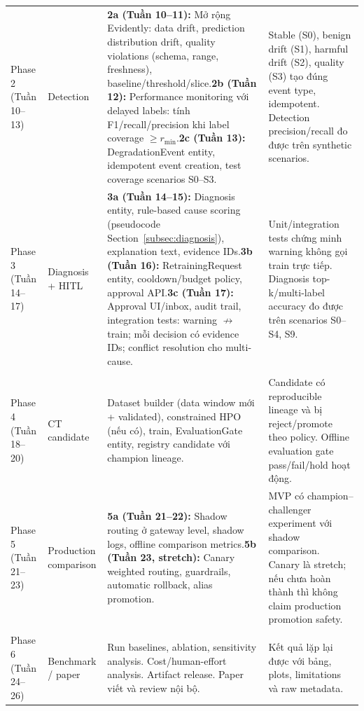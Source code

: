 \documentclass[11pt,a4paper]{article}
\begin{document}
\begin{longtable}{@{}P{1.4cm}P{2.8cm}P{4.0cm}P{5.2cm}@{}}
Phase 2 (Tuần 10--13) & Detection & \textbf{2a (Tuần 10--11):} Mở rộng Evidently: data drift, prediction distribution drift, quality violations (schema, range, freshness), baseline/threshold/slice.\newline \textbf{2b (Tuần 12):} Performance monitoring với delayed labels: tính F1/recall/precision khi label coverage $\ge r_\text{min}$.\newline \textbf{2c (Tuần 13):} DegradationEvent entity, idempotent event creation, test coverage scenarios S0--S3. & Stable (S0), benign drift (S1), harmful drift (S2), quality (S3) tạo đúng event type, idempotent. Detection precision/recall đo được trên synthetic scenarios. \\
\addlinespace

Phase 3 (Tuần 14--17) & Diagnosis + HITL & \textbf{3a (Tuần 14--15):} Diagnosis entity, rule-based cause scoring (pseudocode Section~\ref{subsec:diagnosis}), explanation text, evidence IDs.\newline \textbf{3b (Tuần 16):} RetrainingRequest entity, cooldown/budget policy, approval API.\newline \textbf{3c (Tuần 17):} Approval UI/inbox, audit trail, integration tests: warning $\not\rightarrow$ train; mỗi decision có evidence IDs; conflict resolution cho multi-cause. & Unit/integration tests chứng minh warning không gọi train trực tiếp. Diagnosis top-k/multi-label accuracy đo được trên scenarios S0--S4, S9. \\

\addlinespace
{}\\
\addlinespace

Phase 4 (Tuần 18--20) & CT candidate & Dataset builder (data window mới + validated), constrained HPO (nếu có), train, EvaluationGate entity, registry candidate với champion lineage. & Candidate có reproducible lineage và bị reject/promote theo policy. Offline evaluation gate pass/fail/hold hoạt động. \\
\addlinespace

Phase 5 (Tuần 21--23) & Production comparison & \textbf{5a (Tuần 21--22):} Shadow routing ở gateway level, shadow logs, offline comparison metrics.\newline \textbf{5b (Tuần 23, stretch):} Canary weighted routing, guardrails, automatic rollback, alias promotion. & MVP có champion--challenger experiment với shadow comparison. Canary là stretch; nếu chưa hoàn thành thì không claim production promotion safety. \\

\addlinespace
{}\\
\addlinespace

Phase 6 (Tuần 24--26) & Benchmark / paper & Run baselines, ablation, sensitivity analysis. Cost/human-effort analysis. Artifact release. Paper viết và review nội bộ. & Kết quả lặp lại được với bảng, plots, limitations và raw metadata. \\
\bottomrule
\end{longtable}
\end{document}
